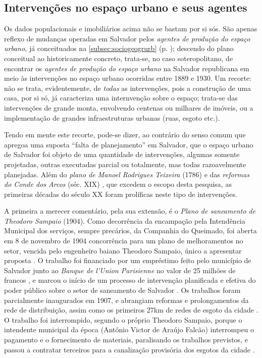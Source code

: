 


\subsection{Intervenções no espaço urbano e seus agentes}\label{subsec:1.4.3}

Os dados populacionais e imobiliários acima não se bastam por si sós. São apenas reflexo de mudanças operadas em Salvador pelos \textit{agentes de produção do espaço urbano}, já conceituados na \autoref{subsec:sociogeogrurb} (p. \pageref{subsec:sociogeogrurb}); descendo do plano conceitual ao historicamente concreto, trata-se, no caso soteropolitano, de encontrar os \textit{agentes de produção do espaço urbano} na Salvador republicana em meio às intervenções no espaço urbano ocorridas entre 1889 e 1930. Um recorte: não se trata, evidentemente, de \textit{todas} as intervenções, pois a construção de uma casa, por si só, já caracteriza uma internvenção sobre o espaço; trata-se das intervenções de grande monta, envolvendo centenas ou milhares de imóveis, ou a implementação de grandes infraestruturas urbanas (ruas, esgoto etc.).

Tendo em mente este recorte, pode-se dizer, ao contrário do senso comum que apregoa uma suposta ``falta de planejamento'' em Salvador, que o espaço urbano de Salvador foi objeto de uma quantidade de intervenções, algumas somente projetadas, outras executadas parcial ou totalmente, mas todas razoavelmente planejadas. Além do \textit{plano de Manoel Rodrigues Teixeira} (1786) \cite[p.~318]{ruy_politica_1949} e das \textit{reformas do Conde dos Arcos} (séc. XIX) \cite{sampaio_formas_1999,VASCONCELOS2002}, que excedem o escopo desta pesquisa, as primeiras décadas do século XX foram prolíficas neste tipo de intervenções.

A primeira a merecer comentário, pela sua extensão, é o \textit{Plano de saneamento de Theodoro Sampaio} (1904). Como decorrência da encampação pela Intendência Municipal dos serviços, sempre precários, da Companhia do Queimado, foi aberta em 8 de novembro de 1904 concorrência para um plano de melhoramentos no setor, vencida pelo engenheiro baiano Theodoro Sampaio, único a apresentar proposta \cite[150]{gordilhobarbosa_eau_2004}. O trabalho foi financiado por um empréstimo feito pelo município de Salvador junto ao \textit{Banque de l'Union Parisienne} no valor de 25 milhões de francos \cite[p.~150]{gordilhobarbosa_eau_2004}, e marcou o início de um processo de intervenção planificada e efetiva do poder público sobre o setor de saneamento de Salvador \cite[p.~150]{gordilhobarbosa_eau_2004}. Os trabalhos foram parcialmente inaugurados em 1907, e abrangiam reformas e prolongamentos da rede de distribuição, assim como os primeiros 27km de redes de esgoto da cidade \cite[p.~151]{gordilhobarbosa_eau_2004}. O trabalho foi interrompido, segundo o próprio Theodoro Sampaio, porque o intendente municipal da época (Antônio Victor de Araújo Falcão) interrompeu o pagamento e o fornecimento de materiais, paralisando os trabalhos previstos, e passou a contratar terceiros para a canalização provisória dos esgotos da cidade \cite[p.~152]{gordilhobarbosa_eau_2004}.

